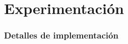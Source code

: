 \chapter{Experimentación}


\subsection{Detalles de implementación}



\subsection{}



\subsection{}



\subsection{}


